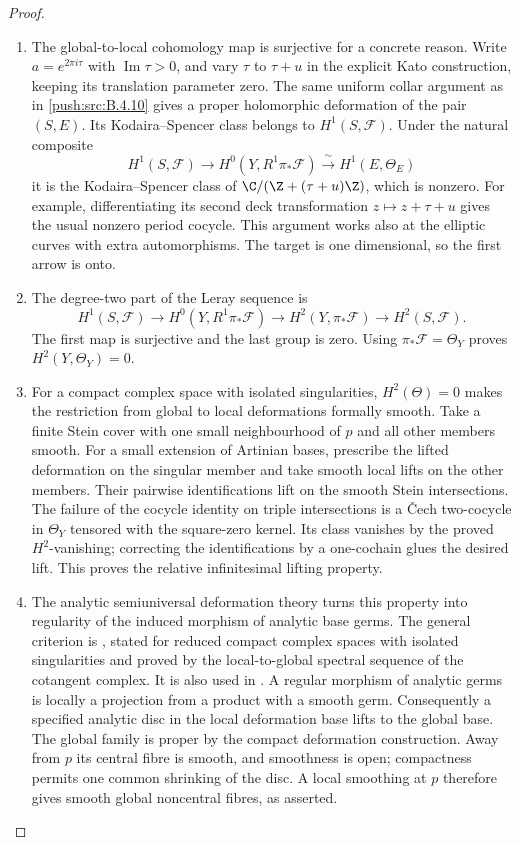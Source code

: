 \begin{proof}
\begin{enumerate}[label=\arabic*.,leftmargin=*]
\item The global-to-local cohomology map is surjective for a concrete
reason.  Write $a=e^{2\pi i\tau}$ with $\operatorname{Im}\tau>0$,
and vary $\tau$ to $\tau+u$ in the explicit Kato construction,
keeping its translation parameter zero.
The same uniform collar argument as in \ref{push:src:B.4.10} gives a proper
holomorphic deformation of the pair $(S,E)$.
Its Kodaira--Spencer class belongs to $H^1(S,\mathcal F)$.
Under the natural composite
\[
 H^1(S,\mathcal F)\longrightarrow
 H^0(Y,R^1\pi_*\mathcal F)
 \xrightarrow{\ \sim\ }H^1(E,\Theta_E)
\]
it is the Kodaira--Spencer class of
$\C/(\Z+(\tau+u)\Z)$, which is nonzero.
For example, differentiating its second deck transformation
$z\mapsto z+\tau+u$ gives the usual nonzero period cocycle.
This argument works also at the elliptic curves with extra
automorphisms.
The target is one dimensional, so the first arrow is onto.

\item The degree-two part of the Leray sequence is
\[
 H^1(S,\mathcal F)\longrightarrow
 H^0(Y,R^1\pi_*\mathcal F)\longrightarrow
 H^2(Y,\pi_*\mathcal F)\longrightarrow H^2(S,\mathcal F).
\]
The first map is surjective and the last group is zero.
Using $\pi_*\mathcal F=\Theta_Y$ proves
$H^2(Y,\Theta_Y)=0$.

\item For a compact complex space with isolated singularities,
$H^2(\Theta)=0$ makes the restriction from global to local
deformations formally smooth.
Take a finite Stein cover with one small
neighbourhood of $p$ and all other members smooth.
For a small extension of Artinian bases, prescribe the lifted
deformation on the singular member and take smooth local
lifts on the other members.  Their pairwise identifications
lift on the smooth Stein intersections.  The failure of the
cocycle identity on triple intersections is a \v Cech two-cocycle
in $\Theta_Y$ tensored with the square-zero kernel.
Its class vanishes by the proved $H^2$-vanishing; correcting
the identifications by a one-cochain glues the desired lift.
This proves the relative infinitesimal lifting property.

\item The analytic semiuniversal deformation theory turns this
property into regularity of the induced morphism of analytic
base germs.  The general criterion is
\citet[Lemma~1, p.~93]{Manetti1991D}, stated for reduced compact
complex spaces with isolated singularities and proved by the
local-to-global spectral sequence of the cotangent complex.
It is also used in
\citet[arXiv version~2, Section~3.2, Proposition~3.3 and the following discussion, p.~11]{DlousskyTeleman2020D}.
A regular morphism of analytic
germs is locally a projection from a product with a smooth
germ.  Consequently a specified analytic disc in the local
deformation base lifts to the global base.
The global family is proper by the compact deformation
construction.  Away from $p$ its central fibre is smooth,
and smoothness is open; compactness permits one common
shrinking of the disc.  A local smoothing at $p$ therefore
gives smooth global noncentral fibres, as asserted.
\end{enumerate}
\end{proof}